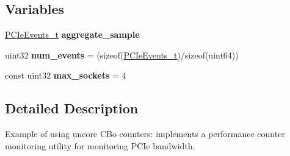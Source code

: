 \subsection*{Variables}
\begin{DoxyCompactItemize}
\item 
\mbox{\label{pcm-pcie_8cpp_a8d06403fc15f27838a1ddb92d5413497}} 
\mbox{\hyperlink{struct_p_c_ie_events__t}{P\+C\+Ie\+Events\+\_\+t}} {\bfseries aggregate\+\_\+sample}
\item 
\mbox{\label{pcm-pcie_8cpp_a9ac6c39dd8f3e56144ef3c7259aa402a}} 
uint32 {\bfseries num\+\_\+events} = (sizeof(\mbox{\hyperlink{struct_p_c_ie_events__t}{P\+C\+Ie\+Events\+\_\+t}})/sizeof(uint64))
\item 
\mbox{\label{pcm-pcie_8cpp_a7ef99323bd02eadd1f92faf654a892be}} 
const uint32 {\bfseries max\+\_\+sockets} = 4
\end{DoxyCompactItemize}


\subsection{Detailed Description}
Example of using uncore C\+Bo counters\+: implements a performance counter monitoring utility for monitoring P\+C\+Ie bandwidth. 

